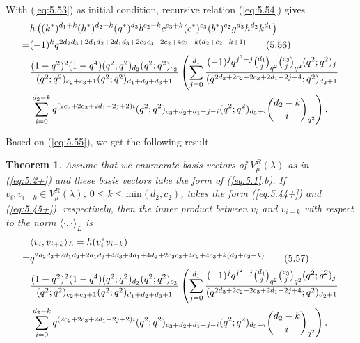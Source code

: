 \documentclass[table,a4paper,reqno]{amsart}
\numberwithin{equation}{section}
\newtheorem{theorem}{Theorem}[section]
\theoremstyle{definition}
\begin{document}
With (\ref{eq:5.53}) as initial condition, recursive relation (\ref{eq:5.54}) gives
\begin{align}\label{eq:5.55}\stepcounter{equation}
        &h\left((k^*)^{d_1+k}(h^*)^{d_2-k}(g^*)^{d_3}b^{c_2-k}c^{c_3+k}(c^*)^{c_3}(b^*)^{c_2}g^{d_3}h^{d_2}k^{d_1}\right)\notag\\
        =&(-1)^kq^{2d_2d_3+2d_1d_2+2d_1d_3+2c_2c_3+2c_2+4c_3+k(d_2+c_2-k+1)}\tag{5.56}\\
        &\frac{(1-q^2)^2(1-q^4)(q^2;q^2)_{d_2}(q^2;q^2)_{c_2}}{(q^2;q^2)_{c_2+c_3+1}(q^2;q^2)_{d_1+d_2+d_3+1}}\left(\sum_{j=0}^{d_1}\frac{(-1)^jq^{j^2-j}{d_1\choose j}_{q^2}{c_3\choose j}_{q^2}(q^2;q^2)_j}{(q^{2d_3+2c_2+2c_3+2d_1-2j+4};q^2)_{d_2+1}}\right.\notag\\
        &\left.\sum_{i=0}^{d_2-k}q^{(2c_2+2c_3+2d_1-2j+2)i}(q^2;q^2)_{c_3+d_2+d_1-j-i}(q^2;q^2)_{d_3+i}{d_2-k\choose i}_{q^2}\right).\notag
\end{align}

Based on (\ref{eq:5.55}), we get the following result.
\begin{theorem}
    Assume that we enumerate basis vectors of $V^R_\mu(\lambda)$ as in (\ref{eq:5.2+}) and these basis vectors take the form of (\ref{eq:5.1}.b). If $v_i,v_{i+k}\in V^R_\mu(\lambda)$, $0\le k\le\text{min}(d_2,c_2)$, takes the form (\ref{eq:5.44+}) and (\ref{eq:5.45+}), respectively, then the inner product between $v_i$ and $v_{i+k}$ with respect to the norm $\langle\cdot,\cdot\rangle_L$ is
    \begin{align}\stepcounter{equation}
            &\langle v_i,v_{i+k}\rangle_L=h(v^*_iv_{i+k})\notag\\
            =&q^{2d_2d_3+2d_1d_2+2d_1d_3+4d_3+4d_1+4d_2+2c_2c_3+4c_2+4c_3+k(d_2+c_2-k)}\tag{5.57}\\
            &\frac{(1-q^2)^2(1-q^4)(q^2;q^2)_{d_2}(q^2;q^2)_{c_2}}{(q^2;q^2)_{c_2+c_3+1}(q^2;q^2)_{d_1+d_2+d_3+1}}\left(\sum_{j=0}^{d_1}\frac{(-1)^jq^{j^2-j}{d_1\choose j}_{q^2}{c_3\choose j}_{q^2}(q^2;q^2)_j}{(q^{2d_3+2c_2+2c_3+2d_1-2j+4};q^2)_{d_2+1}}\right.\notag\\
            &\left.\sum_{i=0}^{d_2-k}q^{(2c_2+2c_3+2d_1-2j+2)i}(q^2;q^2)_{c_3+d_2+d_1-j-i}(q^2;q^2)_{d_3+i}{d_2-k\choose i}_{q^2}\right).\notag
    \end{align}
\end{theorem}
\end{document}
